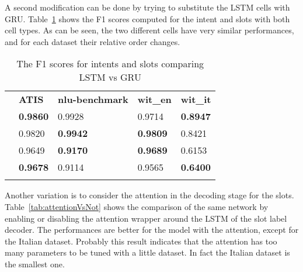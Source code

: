 A second modification can be done by trying to substitute the LSTM cells with GRU. Table~\ref{tab:LSTMvsGRU} shows the F1 scores computed for the intent and slots with both cell types. As can be seen, the two different cells have very similar performances, and for each dataset their relative order changes.


\begin{table}[H]
 			\centering
\begin{tabular}{p{1.05in}p{1.05in}p{1.05in}p{1.05in}p{1.05in}}
\hline
\multicolumn{1}{|p{1.05in}}{} & 
\multicolumn{1}{|p{1.05in}}{\textbf{ATIS}} & 
\multicolumn{1}{|p{1.05in}}{\textbf{nlu-benchmark}} & 
\multicolumn{1}{|p{1.05in}}{\textbf{wit\_en}} & 
\multicolumn{1}{|p{1.05in}|}{\textbf{wit\_it}} \\
\hhline{-----}
\multicolumn{1}{|p{1.05in}}{LSTM intents} & 
\multicolumn{1}{|p{1.05in}}{\textbf{0.9860}} & 
\multicolumn{1}{|p{1.05in}}{0.9928} & 
\multicolumn{1}{|p{1.05in}}{0.9714} & 
\multicolumn{1}{|p{1.05in}|}{\textbf{0.8947}} \\
\hhline{-----}
\multicolumn{1}{|p{1.05in}}{GRU intents} & 
\multicolumn{1}{|p{1.05in}}{0.9820} & 
\multicolumn{1}{|p{1.05in}}{\textbf{0.9942}} & 
\multicolumn{1}{|p{1.05in}}{\textbf{0.9809}} & 
\multicolumn{1}{|p{1.05in}|}{0.8421} \\
\hhline{-----}
\multicolumn{1}{|p{1.05in}}{LSTM slots} & 
\multicolumn{1}{|p{1.05in}}{0.9649} & 
\multicolumn{1}{|p{1.05in}}{\textbf{0.9170}} & 
\multicolumn{1}{|p{1.05in}}{\textbf{0.9689}} & 
\multicolumn{1}{|p{1.05in}|}{0.6153} \\
\hhline{-----}
\multicolumn{1}{|p{1.05in}}{GRU slots} & 
\multicolumn{1}{|p{1.05in}}{\textbf{0.9678}} & 
\multicolumn{1}{|p{1.05in}}{0.9114} & 
\multicolumn{1}{|p{1.05in}}{0.9565} & 
\multicolumn{1}{|p{1.05in}|}{\textbf{0.6400}} \\
\hhline{-----}

\end{tabular}
 \caption{The F1 scores for intents and slots comparing LSTM vs GRU}\label{tab:LSTMvsGRU}
\end{table}
%

Another variation is to consider the attention in the decoding stage for the slots. Table~\ref{tab:attentionVsNot} shows the comparison of the same network by enabling or disabling the attention wrapper around the LSTM of the slot label decoder. The performances are better for the model with the attention, except for the Italian dataset. Probably this result indicates that the attention has too many parameters to be tuned with a little dataset. In fact the Italian dataset is the smallest one.

